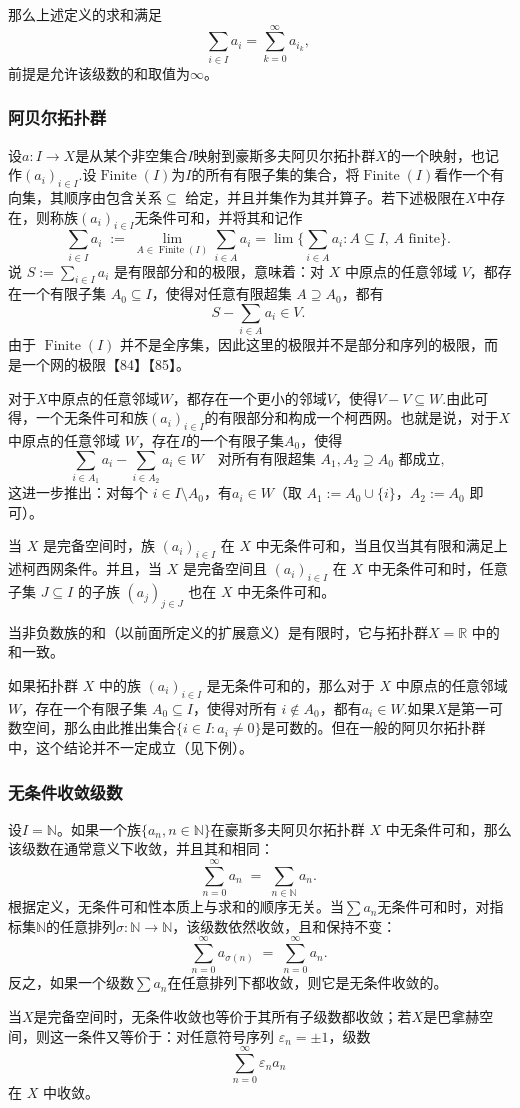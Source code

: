 那么上述定义的求和满足
$$
\sum_{i \in I} a_{i} = \sum_{k=0}^{\infty} a_{i_{k}},~
$$
前提是允许该级数的和取值为$\infty$。

\subsubsection{阿贝尔拓扑群}
设$a: I \to X$是从某个非空集合$I$映射到豪斯多夫阿贝尔拓扑群$X$的一个映射，也记作$(a_{i})_{i \in I}$.设$\operatorname{Finite}(I)$为$I$的所有有限子集的集合，将$\operatorname{Finite}(I)$看作一个有向集，其顺序由包含关系$\subseteq$ 给定，并且并集作为其并算子。若下述极限在$X$中存在，则称族$(a_{i})_{i \in I}$无条件可和，并将其和记作
$$
\sum_{i \in I} a_{i} \;:=\; \lim_{A \in \operatorname{Finite}(I)} \sum_{i \in A} a_{i} 
= \lim \Biggl\{ \sum_{i \in A} a_{i} : A \subseteq I, \, A \text{ finite} \Biggr\}.~
$$
说 $S := \sum_{i \in I} a_{i}$
是有限部分和的极限，意味着：对 $X$ 中原点的任意邻域 $V$，都存在一个有限子集 $A_{0} \subseteq I$，使得对任意有限超集 $A \supseteq A_{0}$，都有
$$
S - \sum_{i \in A} a_{i} \in V.~
$$
由于 $\operatorname{Finite}(I)$ 并不是全序集，因此这里的极限并不是部分和序列的极限，而是一个网的极限【84】【85】。

对于$X$中原点的任意邻域$W$，都存在一个更小的邻域$V$，使得$V - V \subseteq W$.由此可得，一个无条件可和族$(a_{i})_{i \in I}$的有限部分和构成一个柯西网。也就是说，对于$X$中原点的任意邻域 $W$，存在$I$的一个有限子集$A_{0}$，使得
$$
\sum_{i \in A_{1}} a_{i} - \sum_{i \in A_{2}} a_{i} \in W \quad \text{对所有有限超集 } A_{1}, A_{2} \supseteq A_{0} \text{ 都成立},~
$$
这进一步推出：对每个 $i \in I \setminus A_{0}$，有$a_{i} \in W$（取 $A_{1} := A_{0} \cup \{i\}$，$A_{2} := A_{0}$ 即可）。

当 $X$ 是完备空间时，族 $(a_{i})_{i \in I}$ 在 $X$ 中无条件可和，当且仅当其有限和满足上述柯西网条件。并且，当 $X$ 是完备空间且 $(a_{i})_{i \in I}$ 在 $X$ 中无条件可和时，任意子集 $J \subseteq I$ 的子族 $(a_{j})_{j \in J}$ 也在 $X$ 中无条件可和。

当非负数族的和（以前面所定义的扩展意义）是有限时，它与拓扑群$X = \mathbb{R}$ 中的和一致。

如果拓扑群 $X$ 中的族 $(a_{i})_{i \in I}$ 是无条件可和的，那么对于 $X$ 中原点的任意邻域 $W$，存在一个有限子集 $A_{0} \subseteq I$，使得对所有 $i \notin A_{0}$，都有$a_{i} \in W$.如果$X$是第一可数空间，那么由此推出集合$\{i \in I : a_{i} \neq 0\}$是可数的。但在一般的阿贝尔拓扑群中，这个结论并不一定成立（见下例）。
\subsubsection{无条件收敛级数}
设$I = \mathbb{N}$。如果一个族$\{a_{n}, n \in \mathbb{N}\}$在豪斯多夫阿贝尔拓扑群 $X$ 中无条件可和，那么该级数在通常意义下收敛，并且其和相同：
$$
\sum_{n=0}^{\infty} a_{n} \;=\; \sum_{n \in \mathbb{N}} a_{n}.~
$$
根据定义，无条件可和性本质上与求和的顺序无关。当$\sum a_{n}$无条件可和时，对指标集$\mathbb{N}$的任意排列$\sigma : \mathbb{N} \to \mathbb{N}$，该级数依然收敛，且和保持不变：
$$
\sum_{n=0}^{\infty} a_{\sigma(n)} \;=\; \sum_{n=0}^{\infty} a_{n}.~
$$
反之，如果一个级数$\sum a_{n}$在任意排列下都收敛，则它是无条件收敛的。

当$X$是完备空间时，无条件收敛也等价于其所有子级数都收敛；若$X$是巴拿赫空间，则这一条件又等价于：对任意符号序列 $\varepsilon_{n} = \pm 1$，级数
$$
\sum_{n=0}^{\infty} \varepsilon_{n} a_{n}~
$$
在 $X$ 中收敛。

